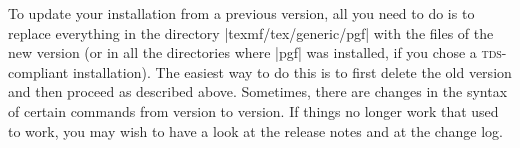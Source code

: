 To update your installation from a previous version, all you need to do is to
replace everything in the directory |texmf/tex/generic/pgf| with the files of
the new version (or in all the directories where |pgf| was installed, if you
chose a \textsc{tds}-compliant installation). The easiest way to do this is to
first delete the old version and then proceed as described above. Sometimes,
there are changes in the syntax of certain commands from version to version. If
things no longer work that used to work, you may wish to have a look at the
release notes and at the change log.
